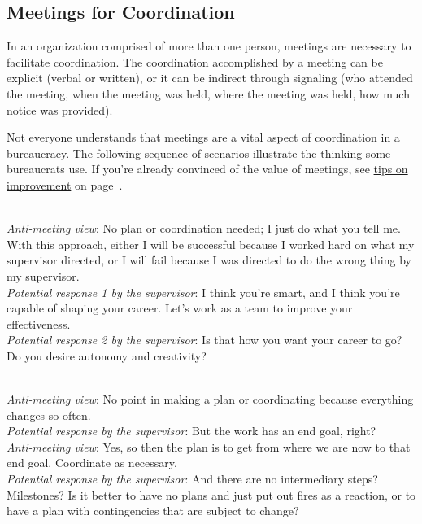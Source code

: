\subsection*{Meetings for Coordination\label{sec:meetings-for-coordination}}
In an organization comprised of more than one person, meetings are necessary to facilitate coordination. The coordination accomplished by a meeting can be explicit (verbal or written), or it can be indirect through signaling (who attended the meeting, when the meeting was held, where the meeting was held, how much notice was provided). 

Not everyone understands that meetings are a vital aspect of coordination in a bureaucracy. The following sequence of scenarios illustrate the thinking some bureaucrats use.
If you're already convinced of the value of meetings, see \hyperref[sec:well-run-meeting]{tips on improvement}
on page~\pageref{sec:well-run-meeting}.


\ \\
\textit{Anti-meeting view}: No plan or coordination needed; I just do what you tell me. With this approach, either I will be successful because I worked hard on what my supervisor directed, or I will fail because I was directed to do the wrong thing by my supervisor.\\
\textit{Potential response 1 by the supervisor}: I think you're smart, and I think you're capable of shaping your career. Let's work as a team to improve your effectiveness. \\
\textit{Potential response 2 by the supervisor}: Is that how you want your career to go? Do you desire autonomy and creativity?

\ \\
\textit{Anti-meeting view}: No point in making a plan or coordinating because everything changes so often. \\
\textit{Potential response by the supervisor}: But the work has an end goal, right?\\
\textit{Anti-meeting view}:  Yes, so then the plan is to get from where we are now to that end goal. Coordinate as necessary. \\
\textit{Potential response by the supervisor}: And there are no intermediary steps? Milestones?
Is it better to have no plans and just put out fires as a reaction, or to have a plan with contingencies that are subject to change? %

